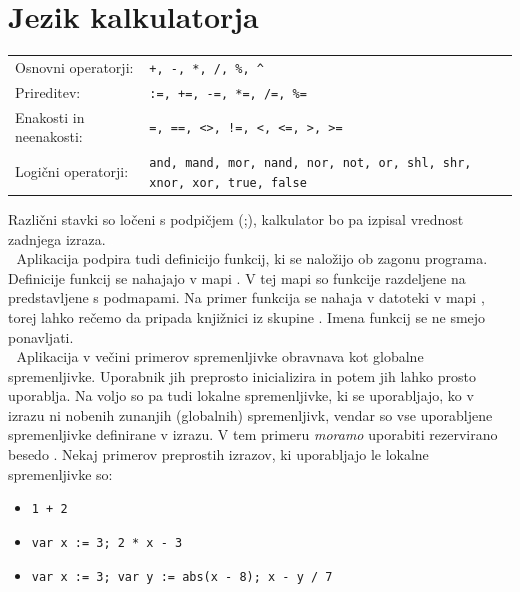 \documentclass[12pt,titlepage]{report}
\makeatletter
\newcommand{\wdot}{\textcolor{white}{.}}
\newcommand{\odstavek}{\wdot \\ \wdot \qquad}
\newcommand{\codequote}[1]{\textquote{\texttt{#1}}}
\newcommand{\group}[2]{\parbox{#1}{\setstretch{0.5}\vspace{5pt}\texttt{#2}\vspace{5pt}}}
\newenvironment{alignitemize}
{

\begin{tabular}{@{$\bullet$ }ll}
}{
\end{tabular}

}
\makeatother
\begin{document}
	\section{Jezik kalkulatorja}
		\begin{alignitemize}
			Osnovni operatorji: &\texttt{+, -, *, /, \%, \^{}} \\
			Prireditev: &\texttt{:=, +=, -=, *=, /=, \%=}\\
			Enakosti in neenakosti: &\texttt{=, ==, <>, !=, <, <=, >, >=}\\
			Logični operatorji: &\group{225pt}{and, mand, mor, nand, nor, not, or, shl, shr, xnor, xor, true, false}\\
			Funkcije: &\group{375pt}{abs, avg, ceil, clamp, equal, erf, erfc, exp, expm1, floor, frac, log, log10, log1p, log2, logn, max, min, mul,  ncdf, nequal, root, round, roundn, sgn, sqrt, sum, swap, trunc}\\
			Trigonometrija: &\group{330pt}{acos, acosh, asin, asinh, atan, atanh, atan2, cos, cosh, cot, csc, sec, sin, sinc, sinh, tan, tanh, hypot, rad2deg, deg2grad, deg2rad, grad2deg}\\
			Nadzor pretoka: &\group{250pt}{if-then-else, trojiški pogojni operator (?:), switch-case, return}\\
			Zanke: &\texttt{while, for, repeat-until, break, continue}
		\end{alignitemize}
		Različni stavki so ločeni s podpičjem (;), kalkulator bo pa izpisal vrednost zadnjega izraza.
		\odstavek
		Aplikacija podpira tudi definicijo funkcij, ki se naložijo ob zagonu programa.
		Definicije funkcij se nahajajo v mapi .
		V tej mapi so funkcije razdeljene na  predstavljene s podmapami.
		Na primer funkcija \codequote{add} se nahaja v datoteki  v mapi , torej lahko rečemo da pripada knjižnici  iz skupine .
		Imena funkcij se ne smejo ponavljati.
		\odstavek
		Aplikacija v večini primerov spremenljivke obravnava kot globalne spremenljivke. Uporabnik jih preprosto inicializira \codequote{x := 3} in potem jih lahko prosto uporablja.
		Na voljo so pa tudi lokalne spremenljivke, ki se uporabljajo, ko v izrazu ni nobenih zunanjih (globalnih) spremenljivk, vendar so vse uporabljene spremenljivke definirane v izrazu. V tem primeru \emph{moramo} uporabiti rezervirano besedo \codequote{var}. Nekaj primerov preprostih izrazov, ki uporabljajo le lokalne spremenljivke so:
		\begin{itemize}
			\item \texttt{1 + 2}
			\item \texttt{var x := 3; 2 * x - 3}
			\item \texttt{var x := 3; var y := abs(x - 8); x - y / 7}
		\end{itemize}
\end{document}
